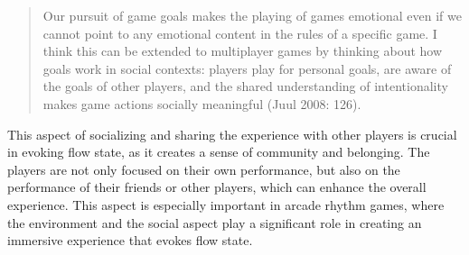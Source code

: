 \begin{quote}
    Our pursuit of game goals makes the playing of games emotional even if we cannot point to any emotional content in the rules of a specific game. I think this can be
    extended to multiplayer games by thinking about how goals work in social contexts: players play for personal goals, are aware of the goals of other players, and the shared understanding of intentionality makes game actions socially meaningful (Juul 2008: 126).
\end{quote}

This aspect of socializing and sharing the experience with other players is crucial in evoking flow state, as it creates a sense of community and belonging. The players are not only focused on their own performance, but also on the performance of their friends or other players, which can enhance the overall experience. This aspect is especially important in arcade rhythm games, where the environment and the social aspect play a significant role in creating an immersive experience that evokes flow state.
